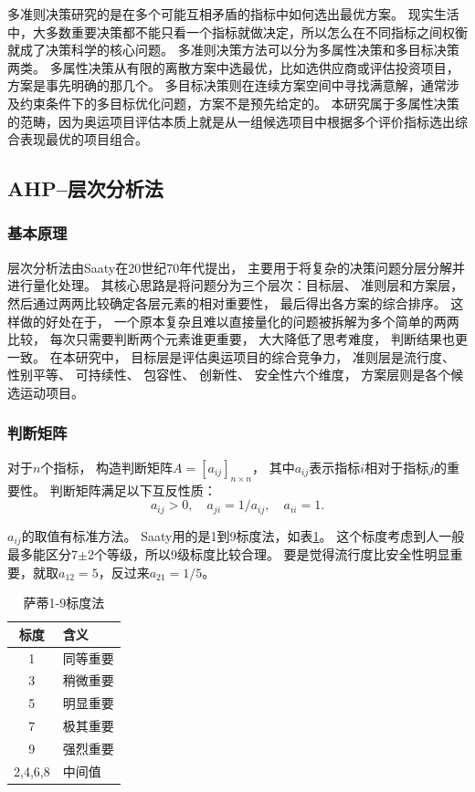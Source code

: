 \documentclass[twoside]{CUGThesis}
\begin{document}
多准则决策研究的是在多个可能互相矛盾的指标中如何选出最优方案。
现实生活中，大多数重要决策都不能只看一个指标就做决定，所以怎么在不同指标之间权衡就成了决策科学的核心问题。
多准则决策方法可以分为多属性决策和多目标决策两类\cite{Hwang1981}。
多属性决策从有限的离散方案中选最优，比如选供应商或评估投资项目，方案是事先明确的那几个。
多目标决策则在连续方案空间中寻找满意解，通常涉及约束条件下的多目标优化问题，方案不是预先给定的。
本研究属于多属性决策的范畴，因为奥运项目评估本质上就是从一组候选项目中根据多个评价指标选出综合表现最优的项目组合。

\subsection{AHP--层次分析法}

\subsubsection{基本原理}

层次分析法由Saaty\cite{Saaty2007}在20世纪70年代提出，
主要用于将复杂的决策问题分层分解并进行量化处理。
其核心思路是将问题分为三个层次：目标层、
准则层和方案层，
然后通过两两比较确定各层元素的相对重要性，
最后得出各方案的综合排序。
这样做的好处在于，
一个原本复杂且难以直接量化的问题被拆解为多个简单的两两比较，
每次只需要判断两个元素谁更重要，
大大降低了思考难度，
判断结果也更一致。
在本研究中，
目标层是评估奥运项目的综合竞争力，
准则层是流行度、
性别平等、
可持续性、
包容性、
创新性、
安全性六个维度，
方案层则是各个候选运动项目。

\subsubsection{判断矩阵}

对于$n$个指标，
构造判断矩阵$A = [a_{ij}]_{n \times n}$，
其中$a_{ij}$表示指标$i$相对于指标$j$的重要性。
判断矩阵满足以下互反性质\cite{Saaty2007}：
\begin{equation}
a_{ij} > 0, \quad a_{ji} = 1/a_{ij}, \quad a_{ii} = 1 .
\label{eq:reciprocal}
\end{equation}

$a_{ij}$的取值有标准方法。
Saaty用的是1到9标度法，如表\ref{tab:scale}。
这个标度考虑到人一般最多能区分7$\pm$2个等级，所以9级标度比较合理。
要是觉得流行度比安全性明显重要，就取$a_{12}=5$，反过来$a_{21}=1/5$。

\begin{table}[htbp]
\centering
\small
\caption{萨蒂1-9标度法\cite{Saaty2007}}
\label{tab:scale}
\begin{tabularx}{\textwidth}{c>{\raggedleft\arraybackslash}X}
\toprule
标度 & 含义 \\
\midrule
1 & 同等重要 \\
3 & 稍微重要 \\
5 & 明显重要 \\
7 & 极其重要 \\
9 & 强烈重要 \\
2,4,6,8 & 中间值 \\
\bottomrule
\end{tabularx}
\end{table}
\end{document}
